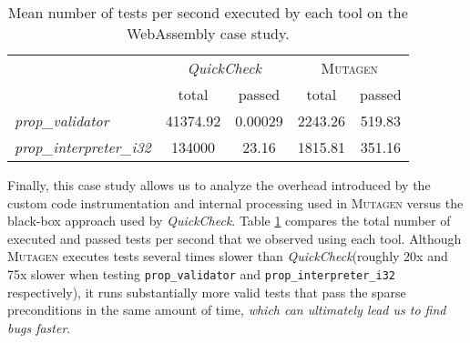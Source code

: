 \documentclass[sigconf,review,anonymous]{acmart}
\newcommand{\quickcheck}{\textit{QuickCheck}\xspace}
\newcommand{\mutagen}{\textsc{Mutagen}\xspace}
\begin{document}
\begin{table}[t]
\footnotesize
\begin{tabular}{|l|c|c|c|c|}
\hline
\multicolumn{1}{|c|}{
  \multirow{2}{*}{Property}}
  & \multicolumn{2}{c|}{\quickcheck}
  & \multicolumn{2}{c|}{\mutagen} \\
  \cline{2-5}
  \multicolumn{1}{|c|}{}
  & \multicolumn{1}{c|}{total}
  & passed
  & \multicolumn{1}{c|}{total}
  & passed \\
\hline
\textit{prop\_validator}
& 41374.92
& 0.00029
& 2243.26
& 519.83\\
\hline
\textit{prop\_interpreter\_i32}
& 134000
& 23.16
& 1815.81
& 351.16 \\
\hline
\end{tabular}
\caption{\label{table:wasm:overhead}Mean number of tests per second executed by
  each tool on the WebAssembly case study.}
\vspace{-10pt}
\end{table}


Finally, this case study allows us to analyze the overhead introduced by the
custom code instrumentation and internal processing used in \mutagen versus the
black-box approach used by \quickcheck.
%
Table \ref{table:wasm:overhead} compares the total number of executed and passed
tests per second that we observed using each tool.
%
Although \mutagen executes tests several times slower than \quickcheck (roughly
20x and 75x slower when testing \texttt{prop\_validator} and
\texttt{prop\_interpreter\_i32} respectively),
%
it runs substantially more valid tests that pass the sparse preconditions in the
same amount of time, \emph{which can ultimately lead us to find bugs faster}.



\end{document}
